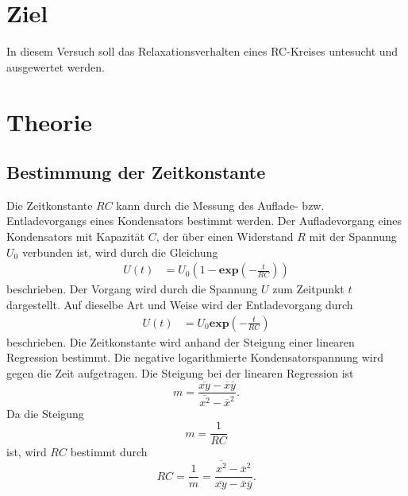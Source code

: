 
\section{Ziel}
In diesem Versuch soll das Relaxationsverhalten eines RC-Kreises untesucht und ausgewertet werden. 

\section{Theorie}
\label{sec:Theorie}
\subsection{Bestimmung der Zeitkonstante}
Die Zeitkonstante $RC$ kann durch die Messung des Auflade- bzw. Entladevorgangs eines Kondensators bestimmt werden.
Der Aufladevorgang eines Kondensators mit Kapazität $C$, der über einen Widerstand $R$ mit der Spannung $U_{0}$ verbunden ist, wird durch die Gleichung
\begin{align*}
     U(t)&= U_{0} (1-\mathbf{exp}(-\frac{t}{RC}))
\end{align*}
beschrieben. Der Vorgang wird durch die Spannung $U$ zum Zeitpunkt $t$ dargestellt. 
Auf dieselbe Art und Weise wird der Entladevorgang durch
\begin{align*}
     U(t)&= U_{0} \mathbf{exp}(-\frac{t}{RC})
\end{align*}
beschrieben.
Die Zeitkonstante wird anhand der Steigung einer linearen Regression bestimmt.
Die negative logarithmierte Kondensatorspannung wird gegen die Zeit aufgetragen.
Die Steigung bei der linearen Regression ist
\begin{equation}
    m = \frac{\overline{xy} - \overline{x}\overline{y}}{\overline{x^2} - \overline{x}^2}.
    \label{eqn: m}
\end{equation}
Da die Steigung
\begin{equation*}
    m = \frac{1}{RC}
\end{equation*}
ist, wird $RC$ bestimmt durch
\begin{equation}
    RC= \frac{1}{m} = \frac{\overline{x^2} - \overline{x}^2}{\overline{xy} - \overline{x} \overline{y}}.
    \label{eqn: RC}
\end{equation}

